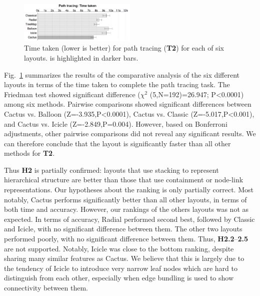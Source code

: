 \documentclass[a4paper]{llncs}
\begin{document}



\begin{figure}
 \centering
 \includegraphics[width=0.5\textwidth]{figures2/T2-time.png}
 \caption{\label{fig:T2-time} Time taken (lower is better) for path tracing (\textbf{T2}) for each of six layouts. \theName{} is highlighted in darker bars.}
\end{figure}

Fig.~\ref{fig:T2-time} summarizes the results of the comparative analysis of the six different layouts in terms of the time taken to complete the path tracing task. The Friedman test showed significant difference ($\chi^2$ (5,N=192)=26.947; P\textless0.0001) among six methods. Pairwise comparisons showed significant differences between Cactus vs. Balloon (Z=-3.935,P\textless0.0001), Cactus vs. Classic (Z=-5.017,P\textless0.001), and Cactus vs. Icicle (Z=-2.849,P=0.004). However, based on Bonferroni adjustments, other pairwise comparisons did not reveal any significant results. We can therefore conclude that the \theName{} layout is significantly faster than all other methods for \textbf{T2}.


Thus \textbf{H2} is partially confirmed: layouts that use stacking to represent hierarchical structure are better than those that use containment or node-link representations. Our hypotheses about the ranking is only partially correct. Most notably, Cactus performs significantly better than all other layouts, in terms of both time and accuracy. %
However, our rankings of the others layouts was not as expected. In terms of accuracy, Radial performed second best, followed by Classic and Icicle, with no significant difference between them. The other two layouts performed poorly, with no significant difference between them. Thus, \textbf{H2.2}--\textbf{2.5} are not supported. Notably, Icicle was close to the bottom ranking, despite sharing many similar features as Cactus. We believe that this is largely due to the tendency of Icicle to introduce very narrow leaf nodes which are hard to distinguish from each other, especially when edge bundling is used to show connectivity between them.
\end{document}
